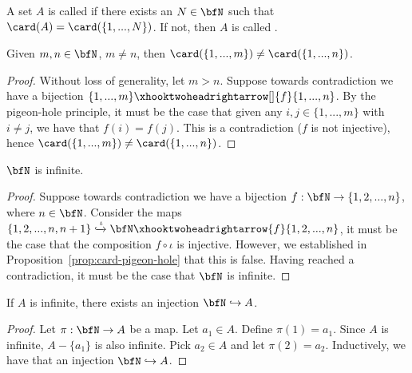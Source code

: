         \begin{definition}
            A set $A$ is called  if there exists an $N \in \bfN$ such that $\card(A) = \card(\{1,...,N\})$. If not, then $A$ is called .
        \end{definition}

        \begin{proposition}\label{prop:card-pigeon-hole}
            Given $m,n \in \bfN$, $m \neq n$, then $\card(\{1,...,m\}) \neq \card(\{1,...,n\})$.
        \end{proposition}
            \begin{proof}
                Without loss of generality, let $m > n$. Suppose towards contradiction we have a bijection $\{1,...,m\} \xhooktwoheadrightarrow[]{f} \{1,...,n\}$. By the pigeon-hole principle, it must be the case that \textemdash given any $i,j \in \{1,...,m\}$ with $i\neq j$, we have that $f(i) = f(j)$. This is a contradiction ($f$ is not injective), hence $\card(\{1,...,m\}) \neq \card(\{1,...,n\})$.
            \end{proof}

        \begin{proposition}
            $\bfN$ is infinite.
        \end{proposition}
            \begin{proof}
                Suppose towards contradiction we have a bijection $f:\bfN \rightarrow \{1,2,...,n\}$, where $n \in \bfN$. Consider the maps $\{1,2,...,n,n+1\} \xhookrightarrow{\iota} \bfN \xhooktwoheadrightarrow{f} \{1,2,...,n\}$, it must be the case that the composition $f \circ \iota$ is injective. However, we established in Proposition~\ref{prop:card-pigeon-hole} that this is false. Having reached a contradiction, it must be the case that $\bfN$ is infinite.
            \end{proof}

        \begin{exercise}\label{exercise:infinite-implies-injection}
            If $A$ is infinite, there exists an injection $\bfN \hookrightarrow A$.
        \end{exercise}
            \begin{proof}
                Let $\pi:\bfN \rightarrow A$ be a map. Let $a_1 \in A$. Define $\pi(1) = a_1$. Since $A$ is infinite, $A - \{a_1\}$ is also infinite. Pick $a_2 \in A$ and let $\pi(2) = a_2$. Inductively, we have that an injection $\bfN \hookrightarrow A$.
            \end{proof}

